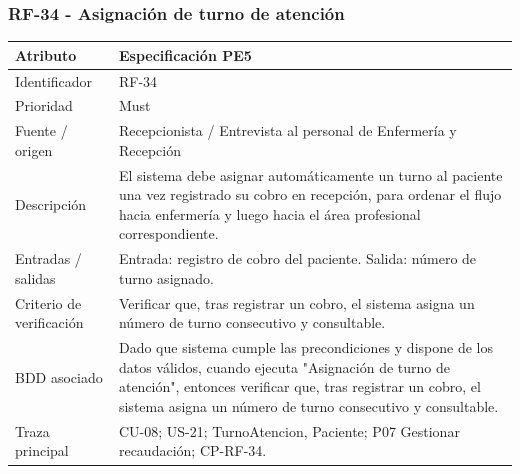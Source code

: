 \documentclass[11pt,a4paper]{article}
\begin{document}
	\subsubsection{RF-34 - Asignación de turno de atención}
	\begin{tabularx}{\textwidth}{p{3.2cm}Y}
		\toprule
		\textbf{Atributo} & \textbf{Especificación PE5}\\\midrule
		Identificador & RF-34\\
		Prioridad & Must\\
		Fuente / origen & Recepcionista / Entrevista al personal de Enfermería y Recepción\\
		Descripción & El sistema debe asignar automáticamente un turno al paciente una vez registrado su cobro en recepción, para ordenar el flujo hacia enfermería y luego hacia el área profesional correspondiente.\\
		Entradas / salidas & Entrada: registro de cobro del paciente. Salida: número de turno asignado.\\
		Criterio de verificación & Verificar que, tras registrar un cobro, el sistema asigna un número de turno consecutivo y consultable.\\
		BDD asociado & Dado que sistema cumple las precondiciones y dispone de los datos válidos, cuando ejecuta "Asignación de turno de atención", entonces verificar que, tras registrar un cobro, el sistema asigna un número de turno consecutivo y consultable.\\
		Traza principal & CU-08; US-21; TurnoAtencion, Paciente; P07 Gestionar recaudación; CP-RF-34.\\
		\bottomrule
	\end{tabularx}
	\clearpage
\end{document}
